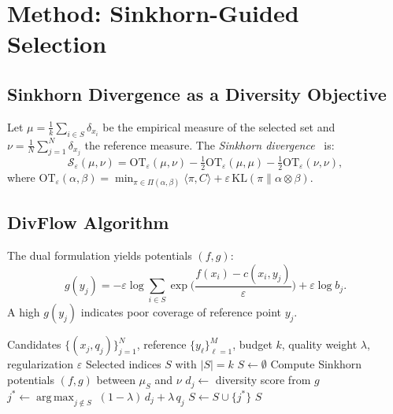 \documentclass[10pt]{article}
\DeclareMathOperator*{\argmax}{arg\,max}
\begin{document}
\section{Method: Sinkhorn-Guided Selection}
\label{sec:method}

\subsection{Sinkhorn Divergence as a Diversity Objective}

Let $\mu = \frac{1}{k}\sum_{i \in S} \delta_{x_i}$ be the empirical measure of the selected set and $\nu = \frac{1}{N}\sum_{j=1}^{N} \delta_{x_j}$ the reference measure.
The \emph{Sinkhorn divergence}~\citep{cuturi2013sinkhorn, feydy2019interpolating} is:
\begin{equation}
\mathcal{S}_\varepsilon(\mu, \nu) = \mathrm{OT}_\varepsilon(\mu, \nu) - \tfrac{1}{2}\mathrm{OT}_\varepsilon(\mu, \mu) - \tfrac{1}{2}\mathrm{OT}_\varepsilon(\nu, \nu),
\label{eq:sinkhorn}
\end{equation}
where $\mathrm{OT}_\varepsilon(\alpha, \beta) = \min_{\pi \in \Pi(\alpha,\beta)} \langle \pi, C \rangle + \varepsilon \,\mathrm{KL}(\pi \| \alpha \otimes \beta)$.

\subsection{DivFlow Algorithm}

The dual formulation yields potentials $(f, g)$:
\begin{equation}
g(y_j) = -\varepsilon \log \sum_{i \in S} \exp\!\Big(\frac{f(x_i) - c(x_i, y_j)}{\varepsilon}\Big) + \varepsilon \log b_j.
\end{equation}
A high $g(y_j)$ indicates poor coverage of reference point $y_j$.

\begin{algorithm}[t]
\caption{DivFlow: Sinkhorn-Guided Diverse Selection}
\label{alg:divflow}
\begin{algorithmic}[1]
\REQUIRE Candidates $\{(x_j, q_j)\}_{j=1}^N$, reference $\{y_\ell\}_{\ell=1}^M$, budget $k$, quality weight $\lambda$, regularization $\varepsilon$
\ENSURE Selected indices $S$ with $|S| = k$
\STATE $S \leftarrow \emptyset$
  \STATE Compute Sinkhorn potentials $(f, g)$ between $\mu_S$ and $\nu$
    \STATE $d_j \leftarrow$ diversity score from $g$
  \ENDFOR
  \STATE $j^* \leftarrow \argmax_{j \notin S}\; (1-\lambda)\, d_j + \lambda\, q_j$
  \STATE $S \leftarrow S \cup \{j^*\}$
\ENDFOR
\RETURN $S$
\end{algorithmic}
\end{algorithm}
\end{document}
